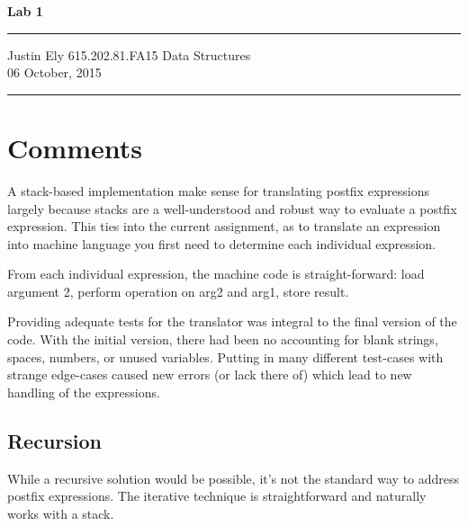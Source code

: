 \documentclass[a4paper,12pt]{article}
\begin{document}
\begin{flushright}

\vspace{1.1cm}

{\bf\Huge Lab 1}

\rule{0.25\linewidth}{0.5pt}

\vspace{0.5cm}
Justin Ely
\linebreak
\newline
\footnotesize{615.202.81.FA15 Data Structures \\}
\vspace{0.5cm}
06 October, 2015
\end{flushright}

\noindent\rule{\linewidth}{1.0pt}


\section*{Comments}
A stack-based implementation make sense for translating postfix expressions largely because stacks are a well-understood
and robust way to evaluate a postfix expression.  This ties into the current assignment, as to translate an expression into machine 
language you first need to determine each individual expression.  

From each individual expression, the machine code is straight-forward: load argument 2, perform operation on arg2 and arg1, store result.  

Providing adequate tests for the translator was integral to the final version of the code.  With the initial version, there had been no 
accounting for blank strings, spaces, numbers, or unused variables.  Putting in many different test-cases with strange edge-cases caused
new errors (or lack there of) which lead to new handling of the expressions.

\subsection*{Recursion}
While a recursive solution would be possible, it's not the standard way to address postfix expressions.  The iterative technique
is straightforward and naturally works with a stack.

\end{document}
